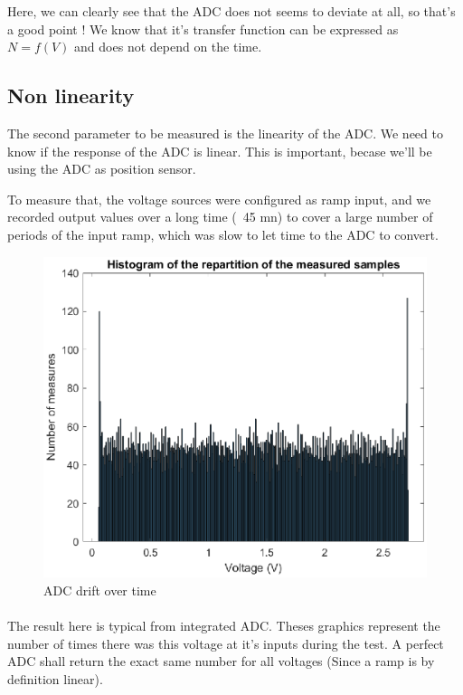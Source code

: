 Here, we can clearly see that the ADC does not seems to deviate at all, so that's a good point ! We 
know that it's transfer function can be expressed as $N = f(V)$ and does not depend on the time.

\FloatBarrier
\subsection{Non linearity}
The second parameter to be measured is the linearity of the ADC. We need to know if the response of 
the ADC is linear. This is important, becase we'll be using the ADC as position sensor.

To measure that, the voltage sources were configured as ramp input, and we recorded output values over
a long time (~45 mn) to cover a large number of periods of the input ramp, which was slow to let time
to the ADC to convert.

\begin{figure}[!hbt]
    \centering
    \includegraphics[width=\SchematicWidth]{images/ADC/ADC-DNL.eps}
    \caption{ADC drift over time}
\end{figure}
\FloatBarrier

\paragraph{}
The result here is typical from integrated ADC. Theses graphics represent the number of times there was this
voltage at it's inputs during the test. 
A perfect ADC shall return the exact same number for all voltages (Since a ramp is by definition linear).

